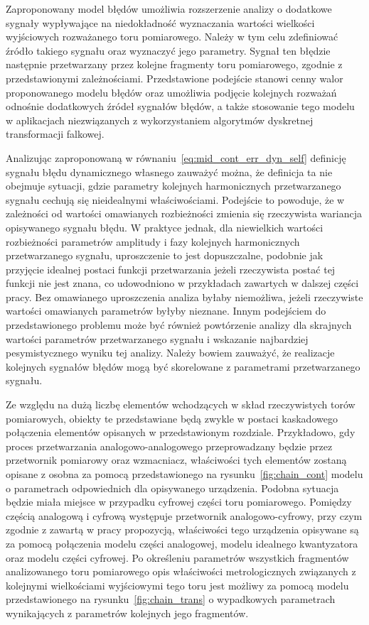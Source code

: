 Zaproponowany model błędów umożliwia rozszerzenie analizy o dodatkowe sygnały wypływające na niedokładność wyznaczania wartości wielkości wyjściowych rozważanego toru pomiarowego. Należy w tym celu zdefiniować źródło takiego sygnału oraz wyznaczyć jego parametry. Sygnał ten błędzie następnie przetwarzany przez kolejne fragmenty toru pomiarowego, zgodnie z przedstawionymi zależnościami. Przedstawione podejście stanowi cenny walor proponowanego modelu błędów oraz umożliwia podjęcie kolejnych rozważań odnośnie dodatkowych źródeł sygnałów błędów, a także stosowanie tego modelu w aplikacjach niezwiązanych z wykorzystaniem algorytmów dyskretnej transformacji falkowej.

Analizując zaproponowaną w równaniu~\eqref{eq:mid_cont_err_dyn_self} definicję sygnału błędu dynamicznego własnego zauważyć można, że definicja ta nie obejmuje sytuacji, gdzie parametry kolejnych harmonicznych przetwarzanego sygnału cechują się nieidealnymi właściwościami. Podejście to powoduje, że w zależności od wartości omawianych rozbieżności zmienia się rzeczywista wariancja opisywanego sygnału błędu. W praktyce jednak, dla niewielkich wartości rozbieżności parametrów amplitudy i fazy kolejnych harmonicznych przetwarzanego sygnału, uproszczenie to jest dopuszczalne, podobnie jak przyjęcie idealnej postaci funkcji przetwarzania jeżeli rzeczywista postać tej funkcji nie jest znana, co udowodniono w przykładach zawartych w dalszej części pracy. Bez omawianego uproszczenia analiza byłaby niemożliwa, jeżeli rzeczywiste wartości omawianych parametrów byłyby nieznane. Innym podejściem do przedstawionego problemu może być również powtórzenie analizy dla skrajnych wartości parametrów przetwarzanego sygnału i wskazanie najbardziej pesymistycznego wyniku tej analizy. Należy bowiem zauważyć, że realizacje kolejnych sygnałów błędów mogą być skorelowane z parametrami przetwarzanego sygnału.

Ze względu na dużą liczbę elementów wchodzących w skład rzeczywistych torów pomiarowych, obiekty te przedstawiane będą zwykle w postaci kaskadowego połączenia elementów opisanych w przedstawionym rozdziale. Przykładowo, gdy proces przetwarzania analogowo-analogowego przeprowadzany będzie przez przetwornik pomiarowy oraz wzmacniacz, właściwości tych elementów zostaną opisane z osobna za pomocą przedstawionego na rysunku~\ref{fig:chain_cont} modelu o parametrach odpowiednich dla opisywanego urządzenia. Podobna sytuacja będzie miała miejsce w przypadku cyfrowej części toru pomiarowego. Pomiędzy częścią analogową i cyfrową występuje przetwornik analogowo-cyfrowy, przy czym zgodnie z zawartą w pracy propozycją, właściwości tego urządzenia opisywane są za pomocą połączenia modelu części analogowej, modelu idealnego kwantyzatora oraz modelu części cyfrowej. Po określeniu parametrów wszystkich fragmentów analizowanego toru pomiarowego opis właściwości metrologicznych związanych z kolejnymi wielkościami wyjściowymi tego toru jest możliwy za pomocą modelu przedstawionego na rysunku~\ref{fig:chain_trans} o wypadkowych parametrach wynikających z parametrów kolejnych jego fragmentów.

